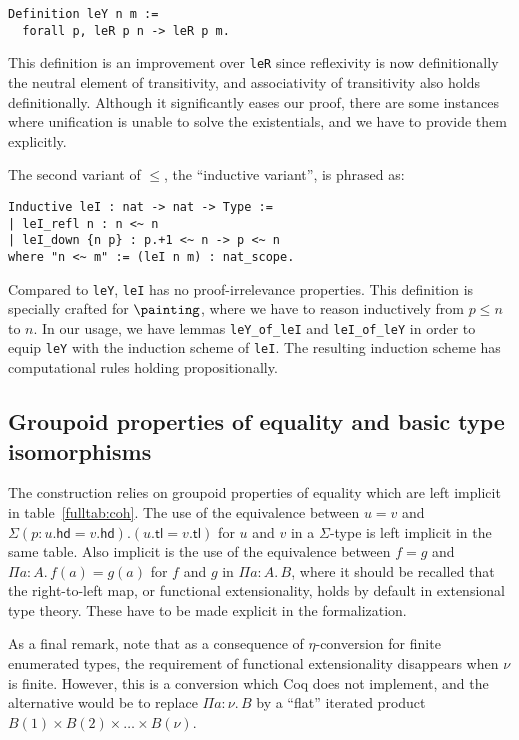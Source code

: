 \documentclass{msc}
\newcommand{\tl}{\ensuremath{\mathsf{tl}}}
\newcommand{\hd}{\ensuremath{\mathsf{hd}}}
\begin{document}
\begin{verbatim}
Definition leY n m :=
  forall p, leR p n -> leR p m.
\end{verbatim}

This definition is an improvement over \texttt{leR} since reflexivity is now definitionally the neutral element of transitivity, and associativity of transitivity also holds definitionally. Although it significantly eases our proof, there are some instances where unification is unable to solve the existentials, and we have to provide them explicitly.

The second variant of $\leq$, the ``inductive variant'', is phrased as:

\begin{verbatim}
Inductive leI : nat -> nat -> Type :=
| leI_refl n : n <~ n
| leI_down {n p} : p.+1 <~ n -> p <~ n
where "n <~ m" := (leI n m) : nat_scope.
\end{verbatim}

Compared to \texttt{leY}, \texttt{leI} has no proof-irrelevance properties. This definition is specially crafted for $\painting$, where we have to reason inductively from $p \leq n$ to $n$. In our usage, we have lemmas \texttt{leY\_of\_leI} and \texttt{leI\_of\_leY} in order to equip \texttt{leY} with the induction scheme of \texttt{leI}. The resulting induction scheme has computational rules holding propositionally.

\subsection{Groupoid properties of equality and basic type isomorphisms\label{sec:eqproperties}}
The construction relies on groupoid properties of equality which are left implicit in table~\ref{fulltab:coh}. The use of the equivalence between $u = v$ and $\Sigma (p:u.\hd = v.\hd). (u.\tl = v.\tl)$ for $u$ and $v$ in a $\Sigma$-type is left implicit in the same table. Also implicit is the use of the equivalence between $f = g$ and $\Pi a: A.\, f(a) = g(a)$ for $f$ and $g$ in $\Pi a: A.\, B$, where it should be recalled that the right-to-left map, or functional extensionality, holds by default in extensional type theory. These have to be made explicit in the formalization.

As a final remark, note that as a consequence of $\eta$-conversion for finite enumerated types, the requirement of functional extensionality disappears when $\nu$ is finite. However, this is a conversion which Coq does not implement, and the alternative would be to replace $\Pi a: \nu.\, B$ by a ``flat'' iterated product $B(1) \times B(2) \times \ldots \times B(\nu)$.
\end{document}
